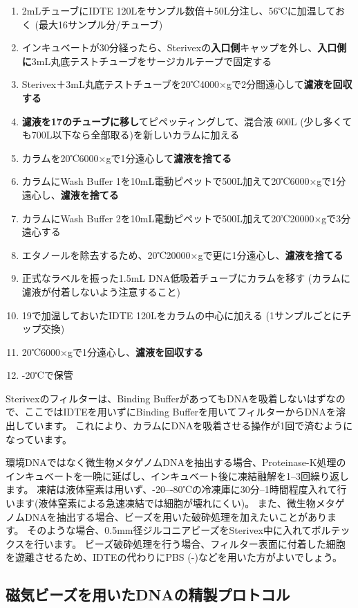\documentclass[titlepage,10pt,a4paper]{jsbook}
\begin{document}
\begin{enumerate}
\item 2mLチューブにIDTE 120{\textmu}Lをサンプル数倍＋50{\textmu}L分注し、56℃に加温しておく (最大16サンプル分/チューブ)
\item インキュベートが30分経ったら、Sterivexの\textbf{入口側}キャップを外し、\textbf{入口側に}3mL丸底テストチューブをサージカルテープで固定する
\item Sterivex＋3mL丸底テストチューブを20℃4000×gで2分間遠心して\textbf{濾液を回収する}
\item \textbf{濾液を17のチューブに移し}てピペッティングして、混合液 600{\textmu}L (少し多くても700{\textmu}L以下なら全部取る)を新しいカラムに加える
\item カラムを20℃6000×gで1分遠心して\textbf{濾液を捨てる}
\item カラムにWash Buffer 1を10mL電動ピペットで500{\textmu}L加えて20℃6000×gで1分遠心し、\textbf{濾液を捨てる}
\item カラムにWash Buffer 2を10mL電動ピペットで500{\textmu}L加えて20℃20000×gで3分遠心する
\item エタノールを除去するため、20℃20000×gで更に1分遠心し、\textbf{濾液を捨てる}
\item 正式なラベルを振った1.5mL DNA低吸着チューブにカラムを移す (カラムに濾液が付着しないよう注意すること)
\item 19で加温しておいたIDTE 120{\textmu}Lをカラムの中心に加える (1サンプルごとにチップ交換)
\item 20℃6000×gで1分遠心し、\textbf{濾液を回収する}
\item -20℃で保管
\end{enumerate}

Sterivexのフィルターは、Binding BufferがあってもDNAを吸着しないはずなので、ここではIDTEを用いずにBinding Bufferを用いてフィルターからDNAを溶出しています。
これにより、カラムにDNAを吸着させる操作が1回で済むようになっています。

環境DNAではなく微生物メタゲノムDNAを抽出する場合、Proteinase-K処理のインキュベートを一晩に延ばし、インキュベート後に凍結融解を1--3回繰り返します。
凍結は液体窒素は用いず、{-20}--{-80}℃の冷凍庫に30分--1時間程度入れて行います(液体窒素による急速凍結では細胞が壊れにくい)。
また、微生物メタゲノムDNAを抽出する場合、ビーズを用いた破砕処理を加えたいことがあります。
そのような場合、0.5mm径ジルコニアビーズをSterivex中に入れてボルテックスを行います\citep{Ushio2019}。
ビーズ破砕処理を行う場合、フィルター表面に付着した細胞を遊離させるため、IDTEの代わりにPBS (-)などを用いた方がよいでしょう。

\subsection{磁気ビーズを用いたDNAの精製プロトコル}
\end{document}
